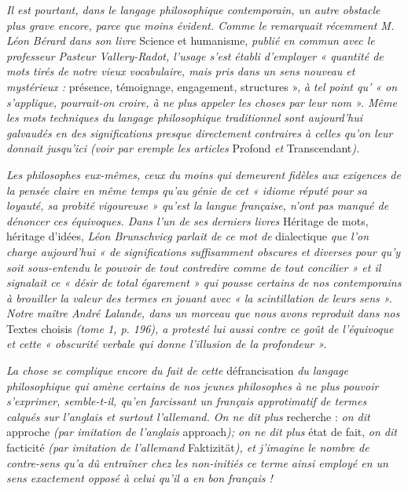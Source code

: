 {\it Il est pourtant, dans le langage philosophique contemporain, un autre
obstacle plus grave encore, parce que moins évident. Comme le remarquait
récemment M. Léon Bérard dans son livre} Science et humanisme, {\it publié
en commun avec le professeur Pasteur Vallery-Radot, l'usage s’est établi
d'employer « quantité de mots tirés de notre vieux vocabulaire, mais pris
dans un sens nouveau et mystérieux :} présence, témoignage, engagement,
structures », {\it à tel point qu’ « on s'applique, pourrait-on croire, à ne plus
appeler les choses par leur nom ». Même les mots techniques du langage philosophique
traditionnel sont aujourd'hui galvaudés en des significations presque
directement contraires à celles qu'on leur donnait jusqu'ici (voir par eremple
les articles} Profond {\it et} Transcendant{\it ).}

{\it Les philosophes eux-mêmes, ceux du moins qui demeurent fidèles aux
exigences de la pensée claire en même temps qu'au génie de cet « idiome réputé
pour sa loyauté, sa probité vigoureuse » qu’est la langue française, n’ont pas
manqué de dénoncer ces équivoques. Dans l’un de ses derniers livres} Héritage
de mots, héritage d'idées, {\it Léon Brunschvicg parlait de ce mot de} dialectique
{\it que l’on charge aujourd’hui « de significations suffisamment obscures et
diverses pour qu'y soit sous-entendu le pouvoir de tout contredire comme de
tout concilier » et il signalait ce « désir de total égarement » qui pousse certains
de nos contemporains à brouiller la valeur des termes en jouant avec « la scintillation
de leurs sens ». Notre maître André Lalande, dans un morceau que
nous avons reproduit dans nos} Textes choisis {\it (tome 1, p. 196), a protesté
lui aussi contre ce goût de l’équivoque et cette « obscurité verbale qui donne
l'illusion de la profondeur ».}

{\it La chose se complique encore du fait de cette} défrancisation {\it du langage
philosophique qui amène certains de nos jeunes philosophes à ne plus pouvoir
s’exprimer, semble-t-il, qu’en farcissant un français approtimatif de termes
calqués sur l'anglais et surtout l'allemand. On ne dit plus} recherche : {\it on dit}
approche {\it (par imitation de l'anglais} approach{\it ); on ne dit plus} état de fait,
{\it on dit} facticité {\it (par imitation de l'allemand} Faktizität{\it ), et j'imagine le
nombre de contre-sens qu'a dû entraîner chez les non-initiés ce terme ainsi
employé en un sens exactement opposé à celui qu’il a en bon français !}


